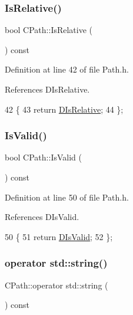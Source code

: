 \subsubsection{\texorpdfstring{Is\+Relative()}{IsRelative()}}
{\footnotesize\ttfamily bool C\+Path\+::\+Is\+Relative (\begin{DoxyParamCaption}{ }\end{DoxyParamCaption}) const\hspace{0.3cm}{\ttfamily [inline]}}



Definition at line 42 of file Path.\+h.



References D\+Is\+Relative.


\begin{DoxyCode}
42                                \{
43             \textcolor{keywordflow}{return} \hyperlink{classCPath_af705ff149bb2281c67afb84fff550eb9}{DIsRelative};  
44         \};
\end{DoxyCode}
\hypertarget{classCPath_a248abbdeb912f48ba4100680540e2061}{}\label{classCPath_a248abbdeb912f48ba4100680540e2061} 
\subsubsection{\texorpdfstring{Is\+Valid()}{IsValid()}}
{\footnotesize\ttfamily bool C\+Path\+::\+Is\+Valid (\begin{DoxyParamCaption}{ }\end{DoxyParamCaption}) const\hspace{0.3cm}{\ttfamily [inline]}}



Definition at line 50 of file Path.\+h.



References D\+Is\+Valid.


\begin{DoxyCode}
50                             \{
51             \textcolor{keywordflow}{return} \hyperlink{classCPath_a992aca27a1cba1c3bae3d04438821192}{DIsValid};  
52         \};
\end{DoxyCode}
\hypertarget{classCPath_a8fade0e7a418c92d5f68ac8872dda8b1}{}\label{classCPath_a8fade0e7a418c92d5f68ac8872dda8b1} 
\subsubsection{\texorpdfstring{operator std\+::string()}{operator std::string()}}
{\footnotesize\ttfamily C\+Path\+::operator std\+::string (\begin{DoxyParamCaption}{ }\end{DoxyParamCaption}) const}



